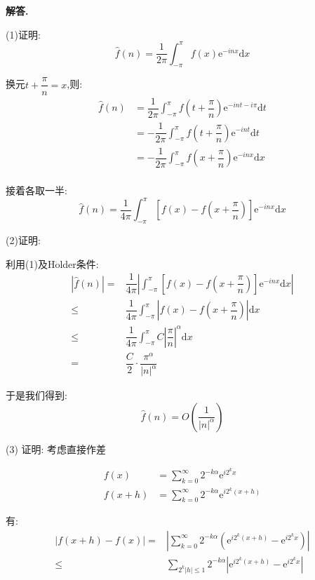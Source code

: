 \documentclass[12pt, a4paper, oneside]{ctexart}
\newenvironment{solution}{\par\noindent\textbf{解答. }}{\par}
\begin{document}
\begin{solution}
\par
(1)证明:
$$
\hat{f}(n)=\dfrac{1}{2\pi}\int_{-\pi}^{\pi}f(x)\mathrm{e}^{-inx}\mathrm{d}x
$$
\par
换元$t+\dfrac{\pi}{n}=x$,则:
$$
\begin{aligned}
\hat{f}(n)&=\dfrac{1}{2\pi}\int_{-\pi}^{\pi}
f\left(t+\dfrac{\pi}{n}\right)\mathrm{e}^{-int-i\pi}\mathrm{d}t\\
&=-\dfrac{1}{2\pi}\int_{-\pi}^{\pi}
f\left(t+\dfrac{\pi}{n}\right)\mathrm{e}^{-int}\mathrm{d}t\\
&=-\dfrac{1}{2\pi}\int_{-\pi}^{\pi}
f\left(x+\dfrac{\pi}{n}\right)\mathrm{e}^{-inx}\mathrm{d}x\\
\end{aligned}
$$
\par
接着各取一半:
$$
\hat{f}(n)=\dfrac{1}{4\pi}\int_{-\pi}^{\pi}\left[f(x)-
f\left(x+\dfrac{\pi}{n}\right)\right]\mathrm{e}^{-inx}\mathrm{d}x
$$
\par
(2)证明:
\par
利用(1)及H$\ddot{\text{o}}$lder条件:
$$
\begin{aligned}
\left|\hat{f}(n)\right|
=&\dfrac{1}{4\pi}\left|\int_{-\pi}^{\pi}\left[f(x)-
f\left(x+\dfrac{\pi}{n}\right)\right]\mathrm{e}^{-inx}\mathrm{d}x\right|\\
\leqslant & \dfrac{1}{4\pi}\int_{-\pi}^{\pi}\left|f(x)-
f\left(x+\dfrac{\pi}{n}\right)\right|\mathrm{d}x\\
\leqslant & \dfrac{1}{4\pi}\int_{-\pi}^{\pi}C\left|\dfrac{\pi}{n}\right|^{\alpha}\mathrm{d}x\\
= & \dfrac{C}{2}\cdot \dfrac{\pi^\alpha}{|n|^{\alpha}}
\end{aligned}
$$
\par
于是我们得到:
$$
\hat{f}(n)=O\left(\dfrac{1}{|n|^{\alpha}}\right)
$$
\par
(3)
证明:
考虑直接作差
\par
$$
\begin{aligned}
f(x)&=\sum_{k=0}^{\infty}2^{-k\alpha}\mathrm{e}^{i2^kx}\\
f(x+h)&=\sum_{k=0}^{\infty}2^{-k\alpha}\mathrm{e}^{i2^k(x+h)}
\end{aligned}
$$
\par
有:
$$
\begin{aligned}
|f(x+h)-f(x)|
=&\left|\sum_{k=0}^{\infty}2^{-k\alpha}
\left(\mathrm{e}^{i2^k(x+h)}-\mathrm{e}^{i2^kx}\right)\right|\\
\leqslant& \sum_{2^k|h|\leqslant 1} 2^{-k\alpha}\left|
\mathrm{e}^{i2^k(x+h)}-\mathrm{e}^{i2^kx}\right|\\

\end{aligned}$$
\end{solution}
\end{document}
